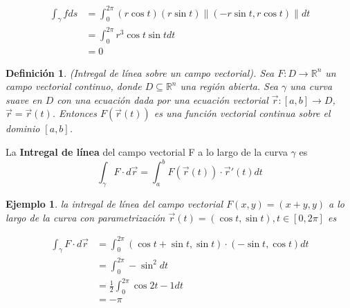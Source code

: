 \documentclass[12pt]{book}
\numberwithin{equation}{section}
\theoremstyle{plain}  %
\newtheorem{Def}{Definición}[chapter]
\newtheorem{Ej}{Ejemplo}[chapter]
\providecommand{\norm}[1]{\lVert#1\rVert} %
\begin{document}
\begin{align*}
    \int_{\gamma} f ds &= \int_{0}^{2\pi} (r \cos{t})(r \sin{t})\norm{(-r \sin{t},r \cos{t})}dt \\
    &= \int_{0}^{2\pi} r^{3} \cos{t} \sin{t} dt \\
    &= 0
\end{align*}
\begin{Def}
(Intregal de línea sobre un campo vectorial). Sea $F: D \to \mathbb{R}^{n}$ un campo vectorial continuo, donde $D \subseteq \mathbb{R}^{n}$ una región abierta. Sea $\gamma$ una curva suave en $D$ con una ecuación dada por una ecuación vectorial $\vec{r}:[a,b] \to D$, $\vec{r}=\vec{r}(t)$. Entonces $F(\vec{r}(t))$ es una función vectorial continua sobre el dominio $[a,b]$.
\end{Def}
La \textbf{Intregal de línea} del campo vectorial F a lo largo de la curva $\gamma$ es 
\begin{equation*}
    \int_{\gamma} F \cdot d\vec{r} = \int_{a}^{b} F(\vec{r}(t)) \cdot \vec{r}'(t)dt
\end{equation*}
\begin{Ej}
la intregal de línea del campo vectorial $F(x,y)=(x+y,y)$ a lo largo de la curva con parametrización $\vec{r}(t)=(\cos{t},\sin{t}), t \in [0,2\pi]$ es 
\end{Ej}
\begin{align*}
\int_{\gamma} F \cdot d\vec{r} &= \int_{0}^{2\pi} (\cos{t} +\sin{t},\sin{t}) \cdot (- \sin{t}, \cos{t})dt \\
&= \int_{0}^{2 \pi} - \sin^{2} dt \\ 
&= \frac{1}{2} \int_{0}^{2 \pi} \cos{2t}-1dt \\ 
&= -\pi
\end{align*}
\end{document}
